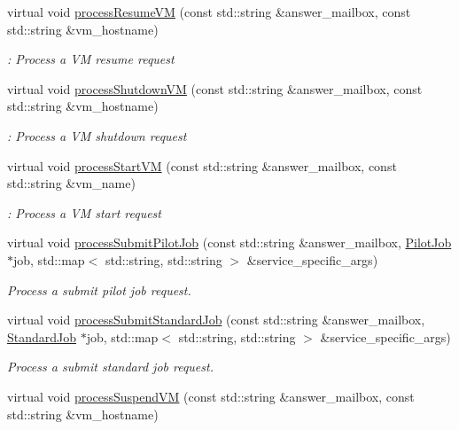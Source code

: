 \begin{DoxyCompactItemize}
virtual void \hyperlink{classwrench_1_1_cloud_service_a3bed2038f4bd826a6b9e91275fc32ffe}{process\+Resume\+VM} (const std\+::string \&answer\+\_\+mailbox, const std\+::string \&vm\+\_\+hostname)
\begin{DoxyCompactList}\small\item\em \+: Process a VM resume request \end{DoxyCompactList}\item 
virtual void \hyperlink{classwrench_1_1_cloud_service_ac485870adfad2159ff5b84cb60be0b1d}{process\+Shutdown\+VM} (const std\+::string \&answer\+\_\+mailbox, const std\+::string \&vm\+\_\+hostname)
\begin{DoxyCompactList}\small\item\em \+: Process a VM shutdown request \end{DoxyCompactList}\item 
virtual void \hyperlink{classwrench_1_1_cloud_service_a1882c193da0b8acfaeb9368751b2caac}{process\+Start\+VM} (const std\+::string \&answer\+\_\+mailbox, const std\+::string \&vm\+\_\+name)
\begin{DoxyCompactList}\small\item\em \+: Process a VM start request \end{DoxyCompactList}\item 
virtual void \hyperlink{classwrench_1_1_cloud_service_abec1934003327f5fae0407fbf0ed66e3}{process\+Submit\+Pilot\+Job} (const std\+::string \&answer\+\_\+mailbox, \hyperlink{classwrench_1_1_pilot_job}{Pilot\+Job} $\ast$job, std\+::map$<$ std\+::string, std\+::string $>$ \&service\+\_\+specific\+\_\+args)
\begin{DoxyCompactList}\small\item\em Process a submit pilot job request. \end{DoxyCompactList}\item 
virtual void \hyperlink{classwrench_1_1_cloud_service_a0019ce489e407b56ac32067ced6fa7a7}{process\+Submit\+Standard\+Job} (const std\+::string \&answer\+\_\+mailbox, \hyperlink{classwrench_1_1_standard_job}{Standard\+Job} $\ast$job, std\+::map$<$ std\+::string, std\+::string $>$ \&service\+\_\+specific\+\_\+args)
\begin{DoxyCompactList}\small\item\em Process a submit standard job request. \end{DoxyCompactList}\item 
virtual void \hyperlink{classwrench_1_1_cloud_service_afb994e90488241a9c23b4ea7fae65180}{process\+Suspend\+VM} (const std\+::string \&answer\+\_\+mailbox, const std\+::string \&vm\+\_\+hostname)

\end{DoxyCompactItemize}
